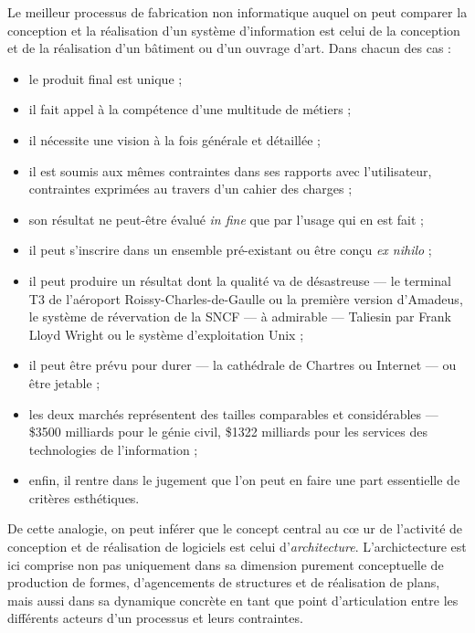 Le meilleur processus de fabrication non informatique auquel on peut comparer la
conception et la r\'ealisation d'un syst\`eme d'information est
celui de la conception et de la r\'ealisation d'un b\^atiment ou
d'un ouvrage d'art. Dans chacun des cas :
\begin{itemize}
  \item le produit final est unique ;
  \item  il fait appel \`a la comp\'etence
    d'une multitude de m\'etiers ;
  \item  il n\'ecessite une vision \`a la
    fois g\'en\'erale et d\'etaill\'ee ;
  \item  il est soumis aux m\^emes
    contraintes dans ses rapports avec l'utilisateur, contraintes exprim\'ees
    au travers d'un cahier des charges ;
  \item  son r\'esultat ne  peut-\^etre \'evalu\'e \emph{in fine} que par l'usage qui en
    est fait ;
  \item  il peut s'inscrire dans un ensemble pr\'e-existant ou
    \^etre con\c{c}u \emph{ex nihilo} ;
  \item  il peut produire un r\'esultat dont la qualit\'e va de d\'esastreuse --- le terminal T3 de
    l'a\'eroport Roissy-Charles-de-Gaulle ou la premi\`ere
    version d'\textsf{Amadeus}, le syst\`eme de r\'evervation de la
    \textsf{SNCF} --- \`a admirable --- Taliesin par Frank Lloyd Wright ou le
    syst\`eme d'exploitation \textsf{Unix} ;
  \item  il peut \^etre pr\'evu    pour durer --- la cath\'edrale de Chartres ou Internet --- ou
    \^etre jetable ;
  \item  les deux march\'es repr\'esentent des tailles
    comparables et consid\'erables --- \$3500 milliards pour le
    g\'enie civil, \$1322 milliards pour les services des
    technologies de l'information ;
  \item enfin, il rentre dans le jugement que l'on
    peut en faire une part essentielle de crit\`eres esth\'etiques.
\end{itemize}
De cette analogie, on peut inf\'erer que le concept central au c\oe
ur  de l'activit\'e de conception et de r\'ealisation de logiciels
est celui d'\emph{architecture}. L'archictecture est ici comprise  non pas uniquement dans sa dimension
purement conceptuelle de production de formes, d'agencements de
structures et de r\'ealisation de plans, mais aussi dans sa dynamique
concr\`ete en tant que  point d'articulation entre les diff\'erents
acteurs d'un processus et leurs contraintes. 

